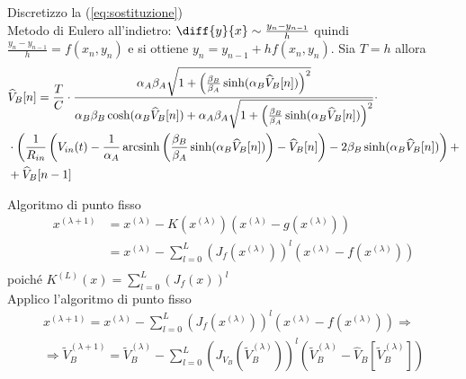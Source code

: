 	Discretizzo la (\ref{eq:sostituzione})\\
	Metodo di Eulero all'indietro: $\diff{y}{x} \sim \frac{y_{n}-y_{n-1}}{h}$ quindi $\frac{y_{n}-y_{n-1}}{h} = f(x_{n},y_{n})$ e si ottiene $y_{n} = y_{n-1}+hf(x_{n},y_{n})$. Sia $T = h$ allora
	\begin{equation}
		\label{eq:discretizzazione}
		\begin{split}
			&\widehat V_{B}[n] = \frac{T}{C}\cdot\frac{\alpha_{A}\beta_{A}\sqrt{1+\left(\frac{\beta_{B}}{\beta_{A}}\sinh(\alpha_{B}\widehat V_{B}[n])\right)^{2}}}{\alpha_{B}\beta_{B}\cosh(\alpha_{B}\widehat V_{B}[n])+\alpha_{A}\beta_{A}\sqrt{1+\left(\frac{\beta_{B}}{\beta_{A}}\sinh(\alpha_{B}\widehat V_{B}[n])\right)^{2}}}\cdot\\&\cdot\left(\frac{1}{R_{in}}\left(V_{in}(t)-\frac{1}{\alpha_{A}} \operatorname{arcsinh} \left(\frac{\beta_{B}}{\beta_{A}} \sinh(\alpha_{B}\widehat V_{B}[n])\right)-\widehat V_{B}[n]\right)-2\beta_{B}\sinh(\alpha_{B}\widehat V_{B}[n])\right)+\\&+\widehat V_{B}[n-1]\\
		\end{split}
	\end{equation}
	
	Algoritmo di punto fisso
	\begin{equation}
		\label{eq:punto_fisso1}
		\begin{split}
			x^{(\lambda+1)} &= x^{(\lambda)}-K(x^{(\lambda)})(x^{(\lambda)}-g(x^{(\lambda)}))\\
			&= x^{(\lambda)}-\sum_{l=0}^{L} \left(J_{f}(x^{(\lambda)})\right)^{l}(x^{(\lambda)}-f(x^{(\lambda)}))\\
		\end{split}
	\end{equation}
	poiché $K^{(L)}(x) = \sum_{l=0}^{L} \left(J_{f}(x)\right)^{l}$\\
	
	Applico l'algoritmo di punto fisso
	\begin{equation}
		\label{eq:punto_fisso2}
		\begin{split}
			x^{(\lambda+1)} = x^{(\lambda)}-\sum_{l=0}^{L} \left(J_{f}(x^{(\lambda)})\right)^{l}(x^{(\lambda)}-f(x^{(\lambda)}))\Rightarrow\\
			\Rightarrow \widetilde V_{B}^{(\lambda+1)} = \widetilde V_{B}^{(\lambda)}-\sum_{l=0}^{L} \left(J_{V_{B}}(\widetilde V_{B}^{(\lambda)})\right)^{l}(\widetilde V_{B}^{(\lambda)}-\widehat V_{B}[\widetilde V_{B}^{(\lambda)}])
		\end{split}
	\end{equation}
	

